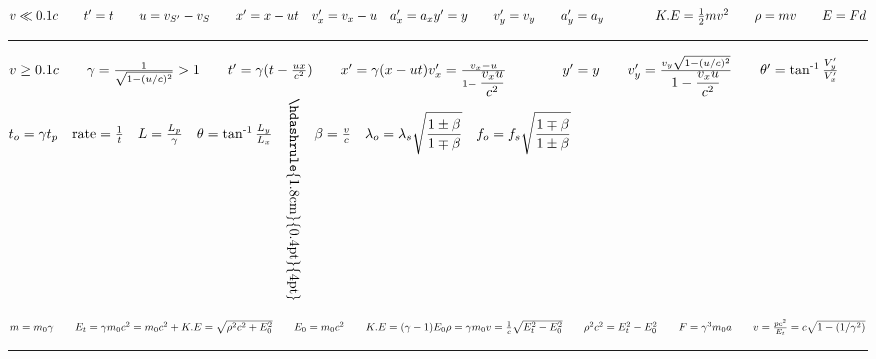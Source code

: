 \documentclass[a4paper,12pt]{article}
\newcommand{\sz}{\text{-}}
\begin{document}

\fontsize{12}{12}\selectfont

\noindent
$
    v \ll 0.1c \qquad t^\prime = t \qquad u = v_{S^\prime} - v_S \qquad x^\prime = x - ut \quad v^\prime_x = v_x - u \quad a_x^\prime = a_x \\
    y^\prime = y \qquad v^\prime_y = v_y \qquad a_y^\prime = a_y \qquad \qquad K.E = \frac{1}{2} mv^2 \qquad \rho = mv \qquad E = F d
$

{\centering \rule{18cm}{0.4pt} \par}

\noindent
$
    v \ge 0.1c \qquad \gamma = \frac{1}{\sqrt{1- (u/c)^2}} > 1 \qquad t^\prime = \gamma (t - \frac{ux}{c^2}) \qquad
    x^\prime = \gamma(x - ut)\\ v^\prime_x = \frac{v_x - u}{1 - \displaystyle \frac{v_x u}{c^2} } \qquad \qquad  y^\prime = y \qquad v^\prime_y = \frac{v_y \sqrt{1-(u/c)^2}}{\displaystyle 1- \frac{v_x u}{c^2}} \qquad \theta^\prime = \tan^{\sz 1}{\frac{V_y^\prime}{V_x^\prime}} \\[-3mm]
$

{\centering \hdashrule{18cm}{0.4pt}{4pt} \par}

\noindent
$ t_o = \gamma t_p \quad \text{rate} = \frac{1}{t} \quad L = \frac{L_p}{\gamma} \quad \theta = \tan^{\sz1}{\frac{L_y}{L_x}} \quad \rotatebox{-90}{\hskip-1cm\hdashrule{1.8cm}{0.4pt}{4pt}} \quad
    \beta = \frac{v}{c} \quad \lambda_o = \lambda_s \displaystyle \sqrt{\frac{1\pm \beta}{1\mp \beta}} \quad f_o = f_s \displaystyle \sqrt{\frac{1\mp \beta}{1\pm \beta}}\\[-.8cm]
$

{\centering \hdashrule{18cm}{0.4pt}{4pt} \par}

\noindent
$ m = m_0 \gamma \qquad E_t = \gamma m_0c^2 = m_0c^2 + K.E = \sqrt{\rho^2 c^2 + E_0^2} \qquad E_0 = m_0 c^2 \qquad K.E = (\gamma - 1) E_0 \\
    \rho = \gamma m_0v = \frac{1}{c} \sqrt{E_t^2 - E_0^2} \qquad \rho^2c^2 = E_t^2 - E_0^2 \qquad F = \gamma^3 m_0 a \qquad v = \frac{p c^2}{E_t} = c \sqrt{1- (1/\gamma^2)} $\\[-1em]

{\centering \rule{18cm}{0.4pt} \par}
\end{document}
